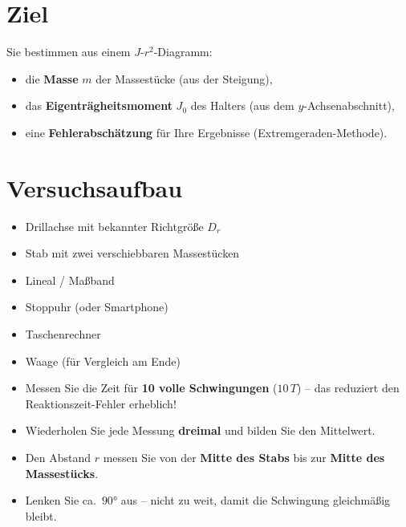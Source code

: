 \documentclass[11pt,a4paper]{scrartcl}
\begin{document}
\section*{Ziel}

Sie bestimmen aus einem $J$-$r^2$-Diagramm:
\begin{itemize}
	\item die \textbf{Masse} $m$ der Massestücke (aus der Steigung),
	\item das \textbf{Eigenträgheitsmoment} $J_0$ des Halters (aus dem $y$-Achsenabschnitt),
	\item eine \textbf{Fehlerabschätzung} für Ihre Ergebnisse (Extremgeraden-Methode).
\end{itemize}

\section*{Versuchsaufbau}

\begin{materialbox}
	\begin{minipage}{0.48\textwidth}
		\begin{itemize}
			\item Drillachse mit bekannter Richtgröße $D_r$
			\item Stab mit zwei verschiebbaren Massestücken
			\item Lineal / Maßband
		\end{itemize}
	\end{minipage}
	\begin{minipage}{0.48\textwidth}
		\begin{itemize}
			\item Stoppuhr (oder Smartphone)
			\item Taschenrechner
			\item Waage (für Vergleich am Ende)
		\end{itemize}
	\end{minipage}
\end{materialbox}

\begin{hilfebox}[title={\faIcon{lightbulb} Tipps zur Messung}]
	\begin{itemize}
		\item Messen Sie die Zeit für \textbf{10 volle Schwingungen} ($10\,T$) -- das reduziert den Reaktionszeit-Fehler erheblich!
		\item Wiederholen Sie jede Messung \textbf{dreimal} und bilden Sie den Mittelwert.
		\item Den Abstand $r$ messen Sie von der \textbf{Mitte des Stabs} bis zur \textbf{Mitte des Massestücks}.
		\item Lenken Sie ca.\ $90°$ aus -- nicht zu weit, damit die Schwingung gleichmäßig bleibt.
	\end{itemize}
\end{hilfebox}
\end{document}
